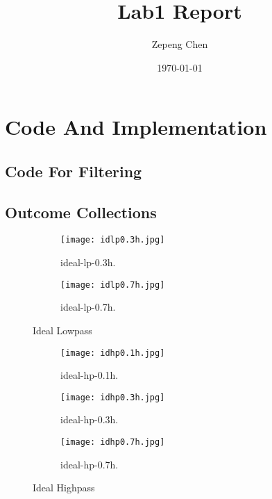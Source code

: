 \documentclass[14pt]{article}
\title{Lab1 Report}
\author{Zepeng Chen}
\date{\today}
\begin{document}
	\maketitle
	\tableofcontents
	\section{Code And Implementation}
	\subsection{Code For Filtering}
	
	

	\newcommand{\RNum}[1]{\uppercase\expandafter{\romannumeral #1\relax}}
	\subsection{Outcome Collections}
	\newpage
	\begin{figure}[hbt!]
		\centering
		\begin{subfigure}[b]{0.45\linewidth}
			\texttt{[image: idlp0.3h.jpg]}
			\caption{ideal-lp-0.3h.}
		\end{subfigure}
		\begin{subfigure}[b]{0.45\linewidth}
			\texttt{[image: idlp0.7h.jpg]}
			\caption{ideal-lp-0.7h.}
		\end{subfigure}
		\caption{Ideal Lowpass}
	\end{figure}
\begin{figure}[hbt!]
	\centering
	\begin{subfigure}[b]{0.3\linewidth}
		\texttt{[image: idhp0.1h.jpg]}
		\caption{ideal-hp-0.1h.}
	\end{subfigure}
	\begin{subfigure}[b]{0.3\linewidth}
		\texttt{[image: idhp0.3h.jpg]}
		\caption{ideal-hp-0.3h.}
	\end{subfigure}
	\begin{subfigure}[b]{0.3\linewidth}
		\texttt{[image: idhp0.7h.jpg]}
		\caption{ideal-hp-0.7h.}
	\end{subfigure}
		\caption{Ideal Highpass}
\end{figure}
\end{document}

